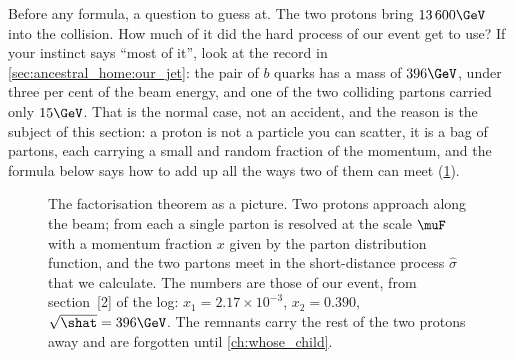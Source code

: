 Before any formula, a question to guess at. The two protons bring
$13\,600\GeV$ into the collision. How much of it did the hard process of our
event get to use? If your instinct says ``most of it'', look at the record in
\cref{sec:ancestral_home:our_jet}: the pair of $b$ quarks has a mass of
$396\GeV$, under three per cent of the beam energy, and one of the two
colliding partons carried only $15\GeV$. That is the normal case, not an
accident, and the reason is the subject of this section: a proton is not a
particle you can scatter, it is a bag of partons, each carrying a small and
random fraction of the momentum, and the formula below says how to add up
all the ways two of them can meet (\cref{fig:ancestral_home:factorisation_sketch}).

\begin{figure}[htbp]\centering
\resizebox{\textwidth}{!}{}
\caption[The factorisation theorem as a picture]{The factorisation theorem as a picture. Two protons approach along the beam; from each a single parton is resolved at the scale $\muF$ with a momentum fraction $x$ given by the parton distribution function, and the two partons meet in the short-distance process $\hat\sigma$ that we calculate. The numbers are those of our event, from section~[2] of the  log: $x_1=2.17\times10^{-3}$, $x_2=0.390$, $\sqrt{\shat}=396\GeV$. The remnants carry the rest of the two protons away and are forgotten until \cref{ch:whose_child}.}
\label{fig:ancestral_home:factorisation_sketch}
\end{figure}

